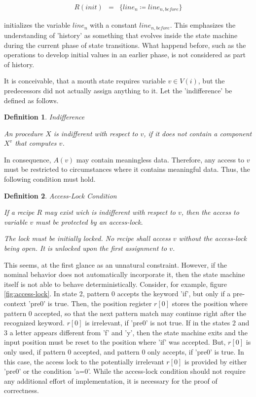 \documentclass[12pt,a4paper]{scrartcl}
\newtheorem{definition}{Definition}
\begin{document}
\begin{eqnarray}
    R(init) & = & \{ line_n \coloneqq line_{n,before} \}
\end{eqnarray}

initializes the variable $line_n$ with a constant $line_{n,before}$. This
emphasizes the understanding of 'history' as something that evolves inside the
state machine during the current phase of state transitions. What happend
before, such as the operations to develop initial values in an earlier phase,
is not considered as part of history. 

It is conceivable, that a mouth state requires variable $v \in V(i)$, but the
predecessors did not actually assign anything to it. Let the 'indifference'
be defined as follows.

\begin{definition} Indifference

    An procedure $X$ is indifferent with respect to $v$, if it does not contain
    a component $X^v$ that computes $v$. 
    
\end{definition}

In consequence, $A(v)$ may contain meaningless data. Therefore, any access to
$v$ must be restricted to circumstances where it contains meaningful data.
Thus, the following condition must hold.

\begin{definition} Access-Lock Condition \label{cond:access-lock}

   If a recipe $R$ may exist wich is indifferent with respect to $v$, then
   the access to variable $v$ must be protected by an access-lock. 

   The lock must be initially locked.  No recipe shall access $v$ without the
   access-lock being open. It is unlocked upon the first assignment to $v$.
    
\end{definition}

This seems, at the first glance as an unnatural constraint. However, if the
nominal behavior does not automatically incorporate it, then the state machine
itself is not able to behave deterministically.  Consider, for example, figure
\ref{fig:access-lock}. In state 2, pattern 0 accepts the keyword 'if', but only
if a pre-context 'pre0' is true. Then, the position register $r[0]$ stores the
position where pattern 0 accepted, so that the next pattern match may continue
right after the recognized keyword. $r[0]$ is irrelevant, if 'pre0' is not
true. If in the states 2 and 3 a letter appears different from 'f' and 'y',
then the state machine exits and the input position must be reset to the
position where 'if' was accepted. But, $r[0]$ is only used, if pattern 0
accepted, and pattern 0 only accepts, if 'pre0' is true.  In this case, the
access lock to the potentially irrelevant $r[0]$ is provided by either 'pre0'
or the condition 'a=0'. While the access-lock condition should not require any
additional effort of implementation, it is necessary for the proof of
correctness.
\end{document}
